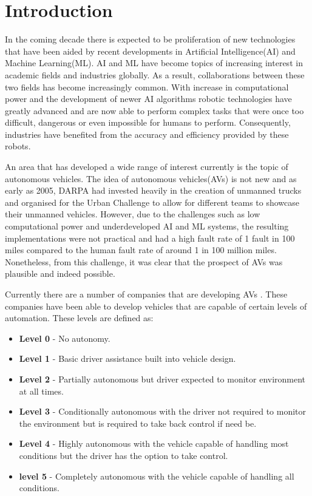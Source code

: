 %
%
\let\textcircled=\pgftextcircled
\chapter{Introduction}
\label{chap:intro}

In the coming decade there is expected to be proliferation of new technologies that have been aided by recent developments in Artificial Intelligence(AI) and Machine Learning(ML). AI and ML have become topics of increasing interest in academic fields and industries globally. As a result, collaborations between these two fields has become increasingly common. 
With increase in computational power and the development of newer AI algorithms robotic technologies have greatly advanced and are now able to perform complex tasks that were once too difficult, dangerous or even impossible for humans to perform. Consequently, industries have benefited from the accuracy and efficiency provided by these robots. 

An area that has developed a wide range of interest currently is the topic of autonomous vehicles. The idea of autonomous vehicles(AVs) is not new and as early as 2005, DARPA had invested heavily in the creation of unmanned trucks and organised for the Urban Challenge to allow for different teams to showcase their unmanned vehicles. However, due to the challenges such as low computational power and underdeveloped AI and ML systems, the resulting implementations were not practical and had a high fault rate of 1 fault in 100 miles compared to the human fault rate of around 1 in 100 million miles. Nonetheless, from this challenge, it was clear that the prospect of AVs was plausible and indeed possible. 

Currently there are a number of companies that are developing AVs . These companies have been able to develop vehicles that are capable of certain levels of automation. These levels are defined as:
\begin{itemize}
	\item \textbf{Level 0} - No autonomy. 
	\item \textbf{Level 1} - Basic driver assistance built into vehicle design.
	\item \textbf{Level 2} - Partially autonomous but driver expected to monitor environment at all times.
	\item \textbf{Level 3} - Conditionally autonomous with the driver not required to monitor the environment but is required to take back control if need be.
	\item \textbf{Level 4} - Highly autonomous with the vehicle capable of handling most conditions but the driver has the option to take control. 
	\item \textbf{level 5} - Completely autonomous with the vehicle capable of handling all conditions.
\end{itemize}

